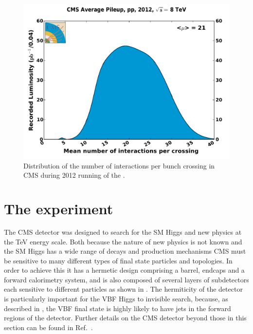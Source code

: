 \begin{figure}
  \includegraphics[width=1.2\largefigwidth]{plots/detector/pileup_pp_2012.pdf}
  \caption{Distribution of the number of interactions per bunch crossing in CMS during 2012 running of the \LHC \cite{CMSLumiPublic}.}
  \label{fig:pusummary}
\end{figure}


\section{The \CMS experiment}
\label{sec:CMSInDetail}
The CMS detector was designed to search for the SM Higgs and new physics at the TeV energy scale. Both because the nature of new physics is not known and the SM Higgs has a wide range of decays and production mechanisms CMS must be sensitive to many different types of final state particles and topologies. In order to achieve this it has a hermetic design comprising a barrel, endcaps and a forward calorimetry system, and is also composed of several layers of subdetectors each sensitive to different particles as shown in . The hermiticity of the detector is particularly important for the VBF Higgs to invisible search, because, as described in , the VBF final state is highly likely to have jets in the forward regions of the detector. Further details on the CMS detector beyond those in this section can be found in Ref.~\cite{Chatrchyan:2008aa}.

